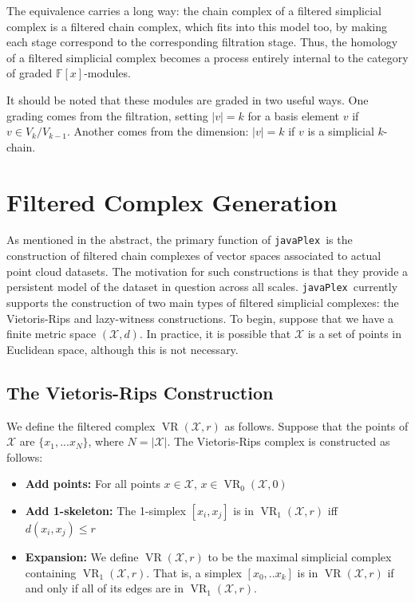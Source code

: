 \documentclass{gts2012}
\newcommand\javaPlex{\texttt{javaPlex}\ }
\newcommand{\VR}{\operatorname{VR}}
\begin{document}
The equivalence carries a long way: the chain complex of a filtered
simplicial complex is a filtered chain complex, which fits into this
model too, by making each stage correspond to the corresponding
filtration stage. Thus, the homology of a filtered simplicial complex
becomes a process entirely internal to the category of graded $\mathbb{F}[x]$-modules.

It should be noted that these modules are graded in two useful ways. One grading
comes from the filtration, setting $|v|=k$ for a basis element $v$ if
$v\in V_k/V_{k-1}$. Another comes from the dimension: $|v|=k$ if $v$
is a simplicial $k$-chain.



\section{Filtered Complex Generation}

As mentioned in the abstract, the primary function of \javaPlex is the construction of filtered chain complexes of vector spaces associated to actual point cloud datasets. The motivation for such constructions is that they provide a persistent model of the dataset in question across all scales. \javaPlex currently supports the construction of two main types of filtered simplicial complexes: the Vietoris-Rips and lazy-witness constructions. To begin, suppose that we have a finite metric space $(\mathcal{X}, d)$. In practice, it is possible that $\mathcal{X}$ is a set of points in Euclidean space, although this is not necessary.

\subsection{The Vietoris-Rips Construction}
We define the filtered complex $\VR(\mathcal{X}, r)$ as follows. Suppose that the points of $\mathcal{X}$ are $\{x_1, ... x_N\}$, where $N = |\mathcal{X}|$. The Vietoris-Rips complex is constructed as follows:

\begin{itemize}
\item {\bf Add points:} For all points $x \in \mathcal{X}$, $x \in \VR_0(\mathcal{X}, 0)$
\item {\bf Add 1-skeleton:} The 1-simplex $[x_i, x_j]$ is in $\VR_1(\mathcal{X}, r)$ iff $d(x_i, x_j) \leq r$
\item {\bf Expansion:} We define $\VR(\mathcal{X}, r)$ to be the maximal simplicial complex containing $\VR_1(\mathcal{X}, r)$. That is, a simplex $[x_0, .. x_k]$ is in $\VR(\mathcal{X}, r)$ if and only if all of its edges are in $\VR_1(\mathcal{X}, r)$.
\end{itemize}
\end{document}
